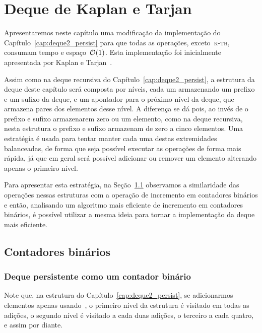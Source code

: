 \documentclass[main.tex]{subfiles}
\begin{document}
\chapter{Deque de Kaplan e Tarjan} \label{cap:deque3_persist}

Apresentaremos neste capítulo uma modificação da implementação do Capítulo~\ref{cap:deque2_persist} para que todas as operações, exceto~\textsc{k-th}, consumam tempo e espaço~$\mathcal{O}(1)$. Esta implementação foi inicialmente apresentada por Kaplan e Tarjan~\cite{KaplanT1999}.

Assim como na deque recursiva do Capítulo~\ref{cap:deque2_persist}, a estrutura da deque deste capítulo será composta por níveis, cada um armazenando um prefixo e um sufixo da deque, e um apontador para o próximo nível da deque, que armazena pares dos elementos desse nível. A diferença se dá pois, ao invés de o prefixo e sufixo armazenarem zero ou um elemento, como na deque recursiva, nesta estrutura o prefixo e sufixo armazenam de zero a cinco elementos. Uma estratégia é usada para tentar manter cada uma destas extremidades balanceadas, de forma que seja possível executar as operações de forma mais rápida, já que em geral será possível adicionar ou remover um elemento alterando apenas o primeiro nível.

Para apresentar esta estratégia, na Seção~\ref{sec:contbin} observamos a similaridade das operações nessas estruturas com a operação de incremento em contadores binários e então, analisando um algoritmo mais eficiente de incremento em contadores binários, é possível utilizar a mesma ideia para tornar a implementação da deque mais eficiente.

\section{Contadores binários} \label{sec:contbin}

\subsection{Deque persistente como um contador binário} \label{subsec:contbin_simples}

Note que, na estrutura do Capítulo~\ref{cap:deque2_persist}, se adicionarmos elementos apenas usando~, o primeiro nível da estrutura é visitado em todas as adições, o segundo nível é visitado a cada duas adições, o terceiro a cada quatro, e assim por diante.
\end{document}

